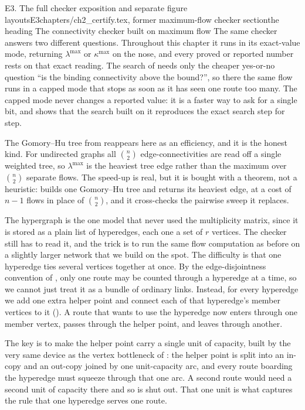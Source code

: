 \begin{offcut}{E3. The full checker exposition and separate figure layouts}{E3}{chapters/ch2\_certify.tex, former maximum-flow checker section}{the heading The connectivity checker built on maximum flow}
The same checker answers two different questions. Throughout this chapter it runs in its exact-value mode, returning $\lambda^{\max}$ or $\kappa^{\max}$ on the nose, and every proved or reported number rests on that exact reading. The search of  needs only the cheaper yes-or-no question ``is the binding connectivity above the bound?'', so there the same flow runs in a capped mode that stops as soon as it has seen one route too many. The capped mode never changes a reported value: it is a faster way to ask for a single bit, and  shows that the search built on it reproduces the exact search step for step.

The Gomory--Hu tree from  reappears here as an efficiency, and it is the honest kind. For undirected graphs all $\binom{n}{2}$ edge-connectivities are read off a single weighted tree, so $\lambda^{\max}$ is the heaviest tree edge rather than the maximum over $\binom{n}{2}$ separate flows. The speed-up is real, but it is bought with a theorem, not a heuristic:  builds one Gomory--Hu tree and returns its heaviest edge, at a cost of $n-1$ flows in place of $\binom{n}{2}$, and it cross-checks the pairwise sweep it replaces.

The hypergraph is the one model that never used the multiplicity matrix, since it is stored as a plain list of hyperedges, each one a set of $r$ vertices. The checker still has to read it, and the trick is to run the same flow computation as before on a slightly larger network that we build on the spot. The difficulty is that one hyperedge ties several vertices together at once. By the edge-disjointness convention of , only one route may be counted through a hyperedge at a time, so we cannot just treat it as a bundle of ordinary links. Instead, for every hyperedge we add one extra helper point and connect each of that hyperedge's member vertices to it (). A route that wants to use the hyperedge now enters through one member vertex, passes through the helper point, and leaves through another.

The key is to make the helper point carry a single unit of capacity, built by the very same device as the vertex bottleneck of : the helper point is split into an in-copy and an out-copy joined by one unit-capacity arc, and every route boarding the hyperedge must squeeze through that one arc. A second route would need a second unit of capacity there and so is shut out. That one unit is what captures the rule that one hyperedge serves one route.


\end{offcut}
